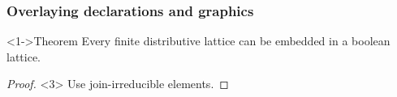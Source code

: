 \documentclass{beamer}
\begin{document}
\begin{frame}
\frametitle{Overlaying declarations and graphics}

\begin{block}<1->{Theorem}
  Every finite distributive lattice can be embedded in a boolean lattice.
\end{block}
\begin{proof}<3>
Use join-irreducible elements.
\end{proof}
\end{frame}
\end{document}

